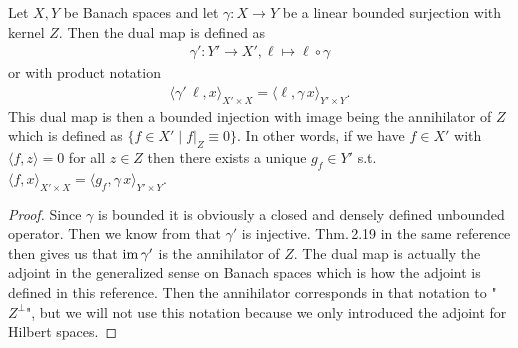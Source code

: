 \documentclass[../master_thesis.tex]{subfiles}
\begin{document}
\begin{lemma}\label{lem:dual_map_of_surjective_operator}
    Let $X, Y$ be Banach spaces and let $\gamma: X \rightarrow Y$ be a 
    linear bounded surjection with kernel $Z$. Then the dual map is defined as
    \begin{align*}
        \gamma': Y' \rightarrow X', \ell \mapsto \ell \circ \gamma
    \end{align*}
    or with product notation
    \begin{align*}
        \langle \gamma' \, \ell, x \rangle_{X' \times X} = \langle \ell, \gamma\,x \rangle_{Y'\times Y}.
    \end{align*}
    This dual map is then a bounded injection with image 
    being the annihilator of $Z$ which is defined as 
    $\{ f \in X' \mid f|_Z \equiv 0 \}$. In other words, if we have $f \in X'$
    with $\langle f, z \rangle = 0$ for all $z \in Z$ then there exists a unique 
    $g_f \in Y'$ s.t. $\langle f, x \rangle_{X' \times X} = \langle g_f, \gamma \, x \rangle_{Y'\times Y}$.
\end{lemma}
\begin{proof}
    Since $\gamma$ is bounded it is obviously a closed and densely defined 
    unbounded operator. Then we know from \cite[Thm.\,2.20]{brezis} that 
    $\gamma'$ is injective. Thm.\,2.19 in the same reference 
    then gives us that $\operatorname{im} \gamma'$ is the annihilator of $Z$. 
    The dual map is actually the adjoint in the generalized sense on Banach spaces 
    which is how the adjoint is defined in this reference. Then the 
    annihilator corresponds in that notation to "$Z^\perp$", but we will not use 
    this notation because we only introduced the adjoint for Hilbert spaces.
\end{proof}
\end{document}
